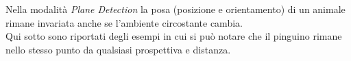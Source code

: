\documentclass[crop=false, class=book]{standalone}
\begin{document}
	\begin{flushleft}
		Nella modalità \emph{Plane Detection} la posa (posizione e orientamento) di un animale rimane invariata anche se l'ambiente circostante cambia.\\
		Qui sotto sono riportati degli esempi in cui si può notare che il pinguino rimane nello stesso punto da qualsiasi prospettiva e distanza.
	\end{flushleft}
	
	\begin{figure}
			\centering
\end{figure}
\end{document}

